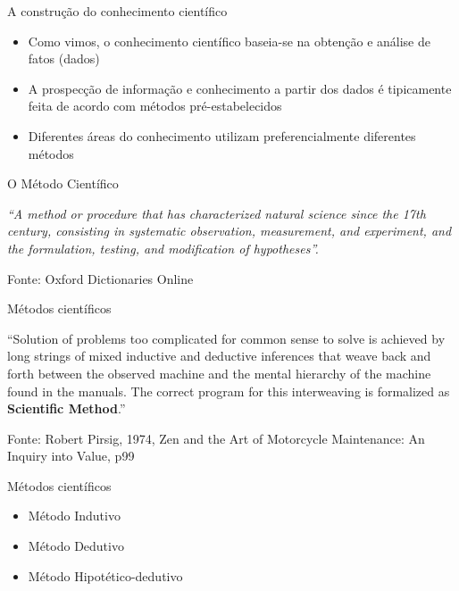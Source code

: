 \documentclass{beamer}
\begin{document}
\begin{frame}{A construção do conhecimento científico}
  \begin{itemize}
  \item Como vimos, o conhecimento científico baseia-se na obtenção e
    análise de fatos (dados)
  \item A prospecção de informação e conhecimento a partir dos dados é
    tipicamente feita de acordo com métodos pré-estabelecidos
  \item Diferentes áreas do conhecimento utilizam preferencialmente
    diferentes métodos
  \end{itemize}
\end{frame}

\begin{frame}{O Método Científico}
  \begin{block}{}
    {\em ``A method or procedure that has characterized natural science since the 17th century, consisting in systematic observation, measurement, and experiment, and the formulation, testing, and modification of hypotheses''.}
  \end{block}

  \vfill
  \footnotesize
  \hfill Fonte: Oxford Dictionaries Online
\end{frame}

\begin{frame}{Métodos científicos}
  \begin{block}{}
    ``Solution of problems too complicated for common sense to solve
    is achieved by long strings of mixed \alert{inductive} and
    \alert{deductive} inferences that weave back and forth between the
    observed machine and the mental hierarchy of the machine found in
    the manuals. The correct program for this interweaving is
    formalized as {\bf Scientific Method}.''
  \end{block}

  \vfill
  \footnotesize
  \hfill Fonte: Robert Pirsig, 1974, Zen and the Art of Motorcycle
  Maintenance: An Inquiry into Value, p99
\end{frame}

\begin{frame}{Métodos científicos}
  \begin{itemize}
  \item Método Indutivo
  \item Método Dedutivo
  \item Método Hipotético-dedutivo
  \end{itemize}
\end{frame}
\end{document}
